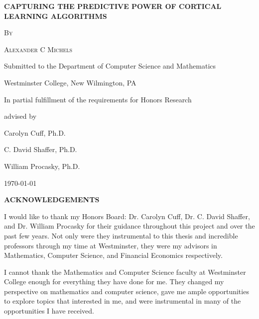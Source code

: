 \documentclass[oneside,12pt,openany]{book}
\renewcommand{\baselinestretch}{1.5}
\begin{document}
	\frontmatter
	\begin{titlepage}
		\centering
		{\scshape\Large \textbf{CAPTURING THE PREDICTIVE POWER OF CORTICAL LEARNING ALGORITHMS} \par}
		\vspace{5.5cm}
		{\scshape\large By \par}
		{\scshape\large Alexander C Michels\par}
		\vfill
		{\large Submitted to the Department of Computer Science and Mathematics\par}
		{\large Westminster College, New Wilmington, PA\par}
		{\large In partial fulfillment of the requirements for Honors Research\par}

		\vfill
		advised by\par
		\large
		Carolyn Cuff, Ph.D.\par
		C. David Shaffer, Ph.D.\par
		William Procasky, Ph.D.\par
		
		\vfill
		
		{\large \today\par}
	\end{titlepage}
	\renewcommand{\baselinestretch}{.7}
	\setcounter{tocdepth}{1}
	\tableofcontents
	\vfill
	\pagebreak
	
	\renewcommand{\baselinestretch}{1.5}
	
	\begin{center}
		\textbf{ACKNOWLEDGEMENTS}
	\end{center}

	I would like to thank my Honors Board: Dr. Carolyn Cuff, Dr. C. David Shaffer, and Dr. William Procasky for their guidance throughout this project and over the past few years. Not only were they instrumental to this thesis and incredible professors through my time at Westminster, they were my advisors in Mathematics, Computer Science, and Financial Economics respectively. 
	
	I cannot thank the Mathematics and Computer Science faculty at Westminster College enough for everything they have done for me. They changed my perspective on mathematics and computer science, gave me ample opportunities to explore topics that interested in me, and were instrumental in many of the opportunities I have received.
	
\end{document}

